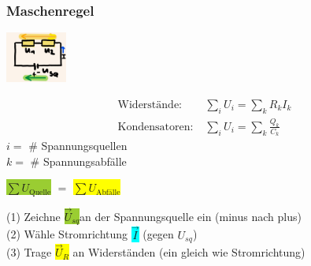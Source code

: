     \subsubsection{Maschenregel}
        \vspace{-1mm}
        \begin{minipage}{0.49\linewidth}
            \begin{footnotesize}
                \begin{center}
                    \vspace{2mm}
                    \includegraphics[width = 20mm]{src/images/maschenregel.png}
                \end{center}
            \end{footnotesize}
        \end{minipage}
        \begin{minipage}{0.5\linewidth}
            \begin{scriptsize}
                \begin{center}
                    \begin{align*}
                        \text{Widerstände:} \; &\sum\limits_{i} U_{i} = \sum\limits_k R_k I_k \\
                        \text{Kondensatoren:} \; &\sum\limits_{i} U_{i} = \sum\limits_k \frac{Q_k}{C_k} 
                    \end{align*}
                    $i =$ \# Spannungsquellen\\
                    $k =$ \# Spannungsabfälle
                \end{center}
                \vspace{1mm}
                \hfill \colorbox{YellowGreen}{$\sum U_\text{Quelle}$} $=$ \colorbox{Yellow}{$\sum U_\text{Abfälle}$} 
            \end{scriptsize}
        \end{minipage}
        \begin{scriptsize}
            (1) Zeichne \colorbox{YellowGreen}{$\vec{U}_{sq}$}an der Spannungsquelle ein (minus nach plus)
            \\(2) Wähle Stromrichtung \colorbox{Cyan}{$\vec{I}$} (gegen $U_{sq}$)
            \\(3) Trage \colorbox{Yellow}{$\vec{U}_R$} an Widerständen (ein gleich wie Stromrichtung)
        \end{scriptsize}